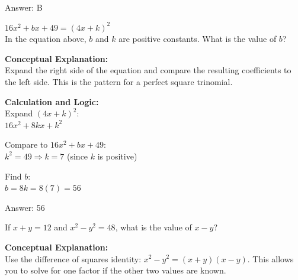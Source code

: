 \documentclass[11pt,paper=a4,answers]{exam}
\begin{document}
\begin{questions}
\begin{solution}
\vspace{25pt}

Answer: \colorbox{yellow!100}{B}
\end{solution}

\vspace{40pt}

\question
$16x^2 + bx + 49 = (4x + k)^2$ \\
In the equation above, $b$ and $k$ are positive constants. What is the value of $b$?

\begin{solution}
\textbf{Conceptual Explanation:} \\
Expand the right side of the equation and compare the resulting coefficients to the left side. This is the pattern for a perfect square trinomial.

\vspace{20pt}

\textbf{Calculation and Logic:} \\
Expand $(4x + k)^2$: \\
$16x^2 + 8kx + k^2$

\vspace{10pt}

Compare to $16x^2 + bx + 49$: \\
$k^2 = 49 \Rightarrow k = 7$ (since $k$ is positive)

\vspace{10pt}

Find $b$: \\
$b = 8k = 8(7) = 56$

\vspace{25pt}

Answer: \colorbox{yellow!100}{56}
\end{solution}

\vspace{40pt}

\question
If $x + y = 12$ and $x^2 - y^2 = 48$, what is the value of $x - y$?

\begin{solution}
\textbf{Conceptual Explanation:} \\
Use the difference of squares identity: $x^2 - y^2 = (x + y)(x - y)$. This allows you to solve for one factor if the other two values are known.

\vspace{20pt}


\end{solution}
\end{questions}
\end{document}
